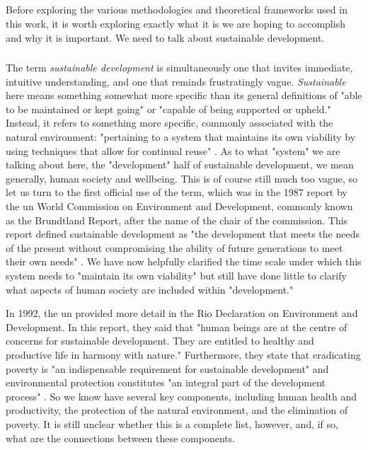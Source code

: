 \subsection{}

Before exploring the various methodologies and theoretical frameworks used in this work, it is worth exploring exactly what it is we are hoping to accomplish and why it is important. We need to talk about sustainable development.
 
\subsubsection{} \label{sec:sustain}

The term \textit{sustainable development} is simultaneously one that invites immediate, intuitive understanding, and one that reminds frustratingly vague. \textit{Sustainable} here means something somewhat more specific than its general definitions of "able to be maintained or kept going" or "capable of being supported or upheld." Instead, it refers to something more specific, commonly associated with the natural environment: "pertaining to a system that maintains its own viability by using techniques that allow for continual reuse" \cite{DefinitionSustainableDictionary}. As to what "system" we are talking about here, the "development" half of sustainable development, we mean generally, human society and wellbeing. This is of course still much too vague, so let us turn to the first official use of the term, which was in the 1987 report by the \ac{un} World Commission on Environment and Development, commonly known as the Brundtland Report, after the name of the chair of the commission. This report defined sustainable development as "the development that meets the needs of the present without compromising the ability of future generations to meet their own needs" \cite{worldcommissiononenvironmentanddevelopmentOurCommonFuture}. We have now helpfully clarified the time scale under which this system needs to "maintain its own viability" but still have done little to clarify what aspects of human society are included within "development." 

In 1992, the \ac{un} provided more detail in the Rio Declaration on Environment and Development. In this report, they said that "human beings are at the centre of concerns for sustainable development. They are entitled to healthy and productive life in harmony with nature." Furthermore, they state that eradicating poverty is "an indispensable requirement for sustainable development" and environmental protection constitutes "an integral part of the development process" \cite{unitednationsconferenceonenvironmentanddevelopmentRioDeclarationEnvironment1992}. So we know have several key components, including human health and productivity, the protection of the natural environment, and the elimination of poverty. It is still unclear whether this is a complete list, however, and, if so, what are the connections between these components.

